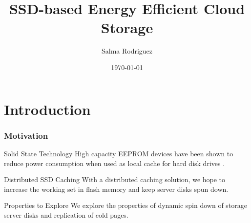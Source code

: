 \documentclass{beamer}
\title{SSD-based Energy Efficient Cloud Storage}
\author{Salma Rodriguez}
\institute [FIU]{
	Florida International University \\
{\emph{srodr063@fiu.edu}}}
\date{\today}
\begin{document}
%
\section{Introduction}
%
\begin{frame}
	\titlepage
\end{frame}
%
\begin{frame}
	\frametitle{Motivation}
	\begin{block}
		{Solid State Technology}
		High capacity EEPROM devices have been shown to
		reduce power consumption when used
		as local cache for hard disk drives \cite{key2,key3}.
	\end{block}
	\vspace{7pt}
	\begin{block}
		{Distributed SSD Caching}
		With a distributed caching solution, we hope to increase
		the working set in flash memory and keep server disks spun down.
	\end{block}
	\vspace{7pt}
	\begin{block}
		{Properties to Explore}
		We explore the properties of dynamic spin down of storage
		server disks and replication of cold pages.
	\end{block}
\end{frame}
%
\end{document}
